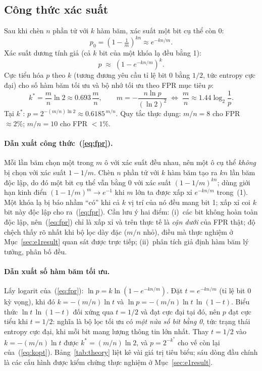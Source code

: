 \documentclass[11pt,a4paper]{article}
\begin{document}
\subsection{Công thức xác suất}
\label{sec:formulas}
Sau khi chèn $n$ phần tử với $k$ hàm băm, xác suất một bit cụ thể còn $0$:
\begin{equation}
p_0=\left(1-\tfrac{1}{m}\right)^{kn}\approx e^{-kn/m}.
\end{equation}
Xác suất dương tính giả (cả $k$ bit của một khóa lạ đều bằng 1):
\begin{equation}
\label{eq:fpr}
p \;\approx\; \left(1-e^{-kn/m}\right)^{k}.
\end{equation}
Cực tiểu hóa $p$ theo $k$ (tương đương yêu cầu tỉ lệ bit $0$ bằng $1/2$,
tức entropy cực đại) cho số hàm băm tối ưu và bộ nhớ tối ưu theo FPR mục tiêu $p$:
\begin{equation}
\label{eq:kopt}
k^{*}=\frac{m}{n}\ln 2\approx 0.693\,\frac{m}{n},\qquad
m=-\frac{n\ln p}{(\ln 2)^{2}}\;\Longleftrightarrow\;
\frac{m}{n}\approx 1.44\log_2\frac{1}{p}.
\end{equation}
Tại $k^{*}$: $p=2^{-(m/n)\ln 2}\approx 0.6185^{\,m/n}$. Quy tắc thực dụng:
$m/n=8$ cho FPR $\approx 2\%$; $m/n=10$ cho FPR $<1\%$.

\paragraph{Dẫn xuất công thức~(\ref{eq:fpr}).}
Mỗi lần băm chọn một trong $m$ ô với xác suất đều nhau, nên một ô cụ thể
\emph{không} bị chọn với xác suất $1-1/m$. Chèn $n$ phần tử với $k$ hàm băm
tạo ra $kn$ lần băm độc lập, do đó một bit cụ thể vẫn bằng $0$ với xác suất
$(1-1/m)^{kn}$; dùng giới hạn kinh điển $(1-1/m)^{m}\to e^{-1}$ khi $m$ lớn
ta được xấp xỉ $e^{-kn/m}$ trong~(1). Một khóa lạ bị báo nhầm ``có'' khi cả
$k$ vị trí của nó đều mang bit 1; xấp xỉ coi $k$ bit này độc lập cho
ra~(\ref{eq:fpr}). Cần lưu ý hai điểm: (i)~các bit không hoàn toàn độc lập,
nên~(\ref{eq:fpr}) chỉ là xấp xỉ và trên thực tế là \emph{cận dưới} của FPR
thật; độ chệch thấy rõ nhất khi bộ lọc dày đặc ($m/n$ nhỏ), điều mà thực
nghiệm ở Mục~\ref{sec:e1result} quan sát được trực tiếp; (ii)~phân tích giả
định hàm băm lý tưởng, phân bố đều.

\paragraph{Dẫn xuất số hàm băm tối ưu.}
Lấy logarit của~(\ref{eq:fpr}): $\ln p = k\ln\!\left(1-e^{-kn/m}\right)$.
Đặt $t=e^{-kn/m}$ (tỉ lệ bit 0 kỳ vọng), khi đó $k=-(m/n)\ln t$ và
$\ln p = -(m/n)\ln t\,\ln(1-t)$. Biểu thức $\ln t\,\ln(1-t)$ đối xứng qua
$t=1/2$ và đạt cực đại tại đó, nên $p$ đạt cực tiểu khi $t=1/2$: nghĩa là
bộ lọc tối ưu có \emph{một nửa số bit bằng 0}, tức trạng thái entropy cực
đại, khi mỗi bit mang lượng thông tin lớn nhất. Thay $t=1/2$ vào $k=-(m/n)\ln t$
được $k^{*}=(m/n)\ln 2$, và $p=2^{-k^{*}}$ cho vế còn lại
của~(\ref{eq:kopt}). Bảng~\ref{tab:theory} liệt kê vài giá trị tiêu biểu;
sáu dòng đầu chính là các cấu hình được kiểm chứng thực nghiệm ở
Mục~\ref{sec:e1result}.
\end{document}
